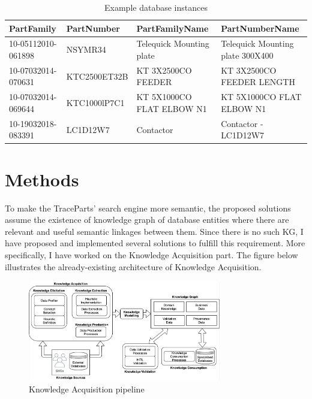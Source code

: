 \begin{table}[H]
	\centering
	\begin{tabular}{|p{}|p{}|p{}|p{}|}
		\hline
		\textbf{PartFamily} & \textbf{PartNumber} & \textbf{PartFamilyName} & \textbf{PartNumberName} \\
		\hline
		10-05112010-061898 & NSYMR34 & Telequick Mounting plate & Telequick Mounting plate 300X400 \\
		10-07032014-070631 & KTC2500ET32B & KT 3X2500CO FEEDER & KT 3X2500CO FEEDER LENGTH \\
		10-07032014-069644 & KTC1000lP7C1 & KT 5X1000CO FLAT ELBOW N1 & KT 5X1000CO FLAT ELBOW N1 \\
		10-19032018-083391 & LC1D12W7 & Contactor & Contactor - LC1D12W7 \\
		\hline
	\end{tabular}
	\caption{Example database instances}
	\label{tab:example_db_instances}
\end{table}

\section{Methods}

To make the TraceParts' search engine more semantic, the proposed solutions assume the existence of 
knowledge graph of database entities where there are relevant and useful semantic linkages between 
them. Since there is no such KG, I have proposed and implemented several solutions to fulfill this 
requirement. More specifically, I have worked on the Knowledge Acquisition part. The figure below 
illustrates the already-existing architecture of Knowledge Acquisition.

\begin{figure}[H]
	\centering
	\includegraphics[width=0.75\textwidth]{../../resources/responding_pipeline.png}
	\caption{Knowledge Acquisition pipeline}
	\label{fig:responding_knowledge_acquisition_pipeline}
\end{figure}

